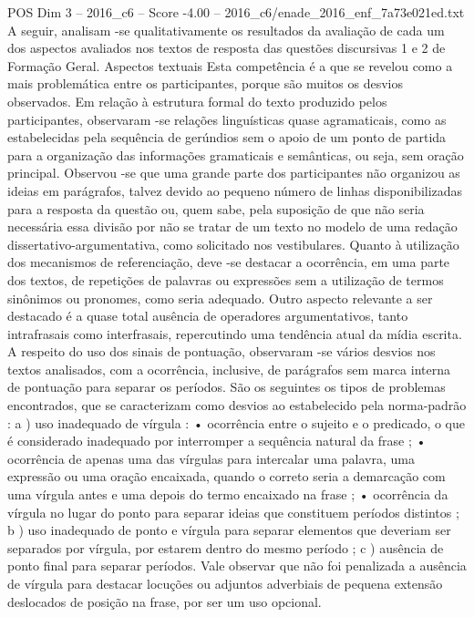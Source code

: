 \begin{textsample}{POS Dim 3 – 2016\_c6 – Score -4.00 – 2016\_c6/enade\_2016\_enf\_7a73e021ed.txt}
A seguir, analisam -se qualitativamente os resultados da avaliação de cada um dos aspectos avaliados nos textos de resposta das questões discursivas 1 e 2 de Formação Geral.
Aspectos textuais Esta competência é a que se revelou como a mais problemática entre os participantes, porque são muitos os desvios observados.
Em relação à estrutura formal do texto produzido pelos participantes, observaram -se relações linguísticas quase agramaticais, como as estabelecidas pela sequência de gerúndios sem o apoio de um ponto de partida para a organização das informações gramaticais e semânticas, ou seja, sem oração principal.
Observou -se que uma grande parte dos participantes não organizou as ideias em parágrafos, talvez devido ao pequeno número de linhas disponibilizadas para a resposta da questão ou, quem sabe, pela suposição de que não seria necessária essa divisão por não se tratar de um texto no modelo de uma redação dissertativo-argumentativa, como solicitado nos vestibulares.
Quanto à utilização dos mecanismos de referenciação, deve -se destacar a ocorrência, em uma parte dos textos, de repetições de palavras ou expressões sem a utilização de termos sinônimos ou pronomes, como seria adequado.
Outro aspecto relevante a ser destacado é a quase total ausência de operadores argumentativos, tanto intrafrasais como interfrasais, repercutindo uma tendência atual da mídia escrita.
A respeito do uso dos sinais de pontuação, observaram -se vários desvios nos textos analisados, com a ocorrência, inclusive, de parágrafos sem marca interna de pontuação para separar os períodos.
São os seguintes os tipos de problemas encontrados, que se caracterizam como desvios ao estabelecido pela norma-padrão : a ) uso inadequado de vírgula : • ocorrência entre o sujeito e o predicado, o que é considerado inadequado por interromper a sequência natural da frase ; • ocorrência de apenas uma das vírgulas para intercalar uma palavra, uma expressão ou uma oração encaixada, quando o correto seria a demarcação com uma vírgula antes e uma depois do termo encaixado na frase ; • ocorrência da vírgula no lugar do ponto para separar ideias que constituem períodos distintos ; b ) uso inadequado de ponto e vírgula para separar elementos que deveriam ser separados por vírgula, por estarem dentro do mesmo período ; c ) ausência de ponto final para separar períodos.
Vale observar que não foi penalizada a ausência de vírgula para destacar locuções ou adjuntos adverbiais de pequena extensão deslocados de posição na frase, por ser um uso opcional.

\end{textsample}
